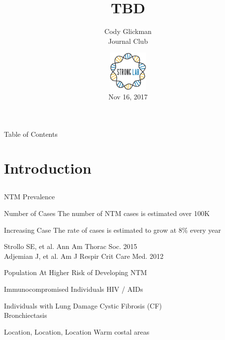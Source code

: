 \documentclass[11pt]{beamer}
\author{Cody Glickman \\ Journal Club}
\title{TBD}
\date{ \includegraphics[height=2cm, width=2cm]{lablogo.png} \\ Nov 16, 2017}
\begin{document}
	\maketitle
	\begin{frame}{Table of Contents}
		\tableofcontents
	\end{frame}
	
	
\section{Introduction}
\subsection{}

	\begin{frame}{NTM Prevalence}
	
		\begin{block}{Number of Cases}
		The number of NTM cases is estimated over 100K
		\end{block}
		
		\begin{block}{Increasing Case}
		The rate of cases is estimated to grow at 8\% every year
		\end{block}
		
		\begin{block}
		
		\end{block}
		
	\tiny{Strollo SE, et al. Ann Am Thorac Soc. 2015 \\
	Adjemian J, et al. Am J Respir Crit Care Med. 2012}
	
	\end{frame}
	
	\begin{frame}{Population At Higher Risk of Developing NTM}
	
		\begin{block}{Immunocompromised Individuals}
		 HIV / AIDs 
		 \end{block}
		 
		 \begin{block}{Individuals with Lung Damage}
		 Cystic Fibrosis (CF) \\ Bronchiectasis 
		 \end{block}
		 
		 \begin{block}{Location, Location, Location}
		 Warm costal areas
		 \end{block}
		 
	\end{frame}
	
\end{document}
